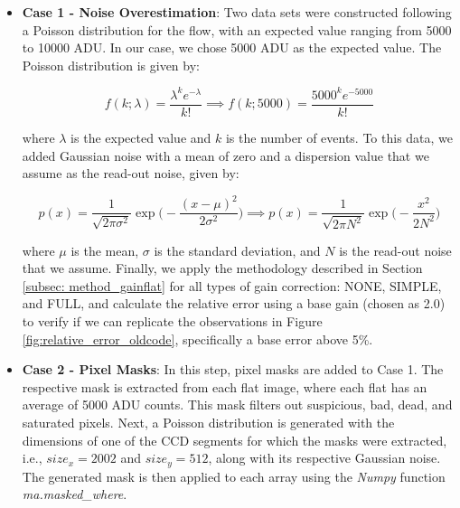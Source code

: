 \begin{itemize}
    \item \textbf{Case 1 - Noise Overestimation}: Two data sets were constructed following a Poisson distribution for the flow, with an expected value ranging from 5000 to 10000 ADU. In our case, we chose 5000 ADU as the expected value. The Poisson distribution is given by:
 
    \begin{equation}
        f(k;\lambda) = \frac{\lambda^k e^{-\lambda}}{k!} \implies f(k;5000) = \frac{5000^k e^{-5000}}{k!}
    \end{equation}
    \label{eq:dist_Poisson}

    where $\lambda$ is the expected value and $k$ is the number of events. To this data, we added Gaussian noise with a mean of zero and a dispersion value that we assume as the read-out noise, given by:
    
    \begin{equation}
        p(x) = \frac{1}{\sqrt{2 \pi \sigma^2}} \exp \Big(-\frac{(x - \mu)^2}{2\sigma^2} \Big) \implies p(x) = \frac{1}{\sqrt{2 \pi N^2}} \exp \Big(-\frac{x^2}{2N^2} \Big)
        \label{eq:gaussian_noise}
    \end{equation}
    
    where $\mu$ is the mean, $\sigma$ is the standard deviation, and $N$ is the read-out noise that we assume. Finally, we apply the methodology described in Section \ref{subsec: method_gainflat} for all types of gain correction: NONE, SIMPLE, and FULL, and calculate the relative error using a base gain (chosen as 2.0) to verify if we can replicate the observations in Figure \ref{fig:relative_error_oldcode}, specifically a base error above 5\%.

    \item \textbf{Case 2 - Pixel Masks}: In this step, pixel masks are added to Case 1. The respective mask is extracted from each flat image, where each flat has an average of 5000 ADU counts. This mask filters out suspicious, bad, dead, and saturated pixels. Next, a Poisson distribution is generated with the dimensions of one of the CCD segments for which the masks were extracted, i.e., $size_x = 2002$ and $size_y = 512$, along with its respective Gaussian noise. The generated mask is then applied to each array using the \textit{Numpy} function \citep{harris2020array} \textit{ma.masked\_where}.


\end{itemize}

